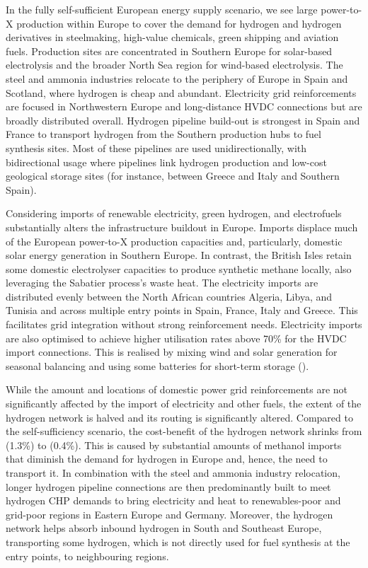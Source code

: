 
In the fully self-sufficient European energy supply scenario, we see large
\mbox{power-to-X} production within Europe to cover the demand for hydrogen and
hydrogen derivatives in steelmaking, high-value chemicals, green shipping and
aviation fuels. Production sites are concentrated in Southern Europe for
solar-based electrolysis and the broader North Sea region for wind-based
electrolysis. The steel and ammonia industries relocate to the periphery of
Europe in Spain and Scotland, where hydrogen is cheap and abundant. Electricity
grid reinforcements are focused in Northwestern Europe and long-distance HVDC
connections but are broadly distributed overall. Hydrogen pipeline build-out is
strongest in Spain and France to transport hydrogen from the Southern production
hubs to fuel synthesis sites. Most of these pipelines are used unidirectionally,
with bidirectional usage where pipelines link hydrogen production and low-cost
geological storage sites (for instance, between Greece and Italy and Southern
Spain).


Considering imports of renewable electricity, green hydrogen, and electrofuels
substantially alters the infrastructure buildout in Europe. Imports displace
much of the European power-to-X production capacities and, particularly,
domestic solar energy generation in Southern Europe. In contrast, the British
Isles retain some domestic electrolyser capacities to produce synthetic methane
locally, also leveraging the Sabatier process's waste heat. The electricity
imports are distributed evenly between the North African countries Algeria,
Libya, and Tunisia and across multiple entry points in Spain, France, Italy and
Greece. This facilitates grid integration without strong reinforcement needs.
Electricity imports are also optimised to achieve higher utilisation rates above
70\% for the HVDC import connections. This is realised by mixing wind and solar
generation for seasonal balancing and using some batteries for short-term
storage ().

While the amount and locations of domestic power grid reinforcements are not
significantly affected by the import of electricity and other fuels, the extent
of the hydrogen network is halved and its routing is significantly altered.
Compared to the self-sufficiency scenario, the cost-benefit of the hydrogen
network shrinks from  (1.3\%) to  (0.4\%). This is caused
by substantial amounts of methanol imports that diminish the demand for hydrogen
in Europe and, hence, the need to transport it. In combination with the steel
and ammonia industry relocation, longer hydrogen pipeline connections are then
predominantly built to meet hydrogen CHP demands to bring electricity and heat
to renewables-poor and grid-poor regions in Eastern Europe and Germany.
Moreover, the hydrogen network helps absorb inbound hydrogen in South and
Southeast Europe, transporting some hydrogen, which is not directly used for
fuel synthesis at the entry points, to neighbouring regions.

